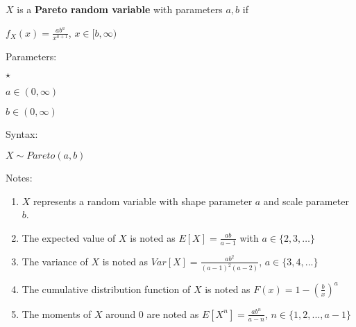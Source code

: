 \documentclass[12pt]{article}
\begin{document}
 $X$ is a \textbf{Pareto random variable} with parameters \textbf{$a, b$} if

$f_X(x) = \frac{a b^a}{x^{a+1}} $, $x\in[b,\infty)$

Parameters:

\begin{list}{$\star$ }{}
\item $a \in (0,\infty)$
\item $b \in (0,\infty)$
\end{list}

Syntax:

$X\sim Pareto(a,b)$

Notes:

\begin{enumerate}
\item $X$ represents a random variable with shape parameter $a$ and scale parameter $b$.
\item The expected value of $X$ is noted as $E[X] = \frac{a b}{a-1}$ with $a\in\{2,3,\ldots\}$
\item The variance of $X$ is noted as $Var[X] = \frac{a b^2}{(a-1)^2 (a-2)}$, $a \in \{3,4,...\}$
\item The cumulative distribution function of $X$ is noted as $F(x) = 1 - (\frac{b}{x})^a$
\item The moments of $X$ around 0 are noted as $E[X^n] = \frac{a b^n}{a-n}$, $n \in \{1,2,...,a-1\}$
\end{enumerate}
\end{document}
